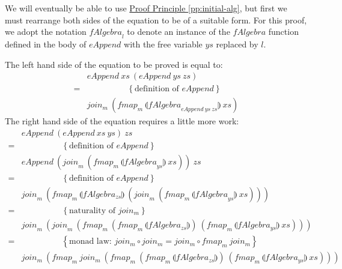 \documentclass{jfp1}
\newcommand{\fold}[1]{\llparenthesis #1 \rrparenthesis}
\newcommand{\eqAnnotation}[1]{\hspace{2cm}\left\{\textrm{#1}\right\}}
\newcommand{\proofprinref}[1]{\hyperref[#1]{Proof Principle \ref*{#1}}}
\begin{document}
\begin{proof*}
  We will eventually be able to use \proofprinref{pp:initial-alg}, but
  first we must rearrange both sides of the equation to be of a
  suitable form. For this proof, we adopt the notation
  $\mathit{fAlgebra}_l$ to denote an instance of the
  $\mathit{fAlgebra}$ function defined in the body of
  $\mathit{eAppend}$ with the free variable $\mathit{ys}$ replaced by
  $l$.

  The left hand side of the equation to be proved is equal to:
  \begin{displaymath}
    \begin{array}{cl}
       &\mathit{eAppend}~\mathit{xs}~(\mathit{eAppend}~\mathit{ys}~\mathit{zs}) \\
       =&\eqAnnotation{definition of $\mathit{eAppend}$} \\
       &\mathit{join_m}~(\mathit{fmap_m}~\fold{\mathit{fAlgebra}_{\mathit{eAppend}~\mathit{ys}~\mathit{zs}}}~\mathit{xs})
    \end{array}
  \end{displaymath}
  The right hand side of the equation requires a little more work:
  \begin{displaymath}
    \begin{array}{cl}
      &\mathit{eAppend}~(\mathit{eAppend}~\mathit{xs}~\mathit{ys})~\mathit{zs} \\
      =&\eqAnnotation{definition of $\mathit{eAppend}$} \\
      &\mathit{eAppend}~(\mathit{join}_m~(\mathit{fmap}_m~\fold{\mathit{fAlgebra}_{\mathit{ys}}}~\mathit{xs}))~\mathit{zs} \\
      =&\eqAnnotation{definition of $\mathit{eAppend}$} \\
      &\mathit{join}_m~(\mathit{fmap}_m~\fold{\mathit{fAlgebra_{zs}}}~(\mathit{join}_m~(\mathit{fmap}_m~\fold{\mathit{fAlgebra}_{\mathit{ys}}}~\mathit{xs}))) \\
      =&\eqAnnotation{naturality of $\mathit{join_m}$} \\
      &\mathit{join}_m~(\mathit{join}_m~(\mathit{fmap}_m~(\mathit{fmap}_m~\fold{\mathit{fAlgebra_{zs}}})~(\mathit{fmap}_m~\fold{\mathit{fAlgebra_{ys}}}~\mathit{xs}))) \\
      =&\eqAnnotation{monad law: $\mathit{join_m} \circ \mathit{join_m} = \mathit{join_m} \circ \mathit{fmap_m}~\mathit{join_m}$} \\
      &\mathit{join_m}~(\mathit{fmap_m}~\mathit{join_m}~(\mathit{fmap}_m~(\mathit{fmap}_m~\fold{\mathit{fAlgebra_{zs}}})~(\mathit{fmap}_m~\fold{\mathit{fAlgebra_{ys}}}~\mathit{xs}))) \\

\end{array}
\end{displaymath}
\end{proof*}
\end{document}
